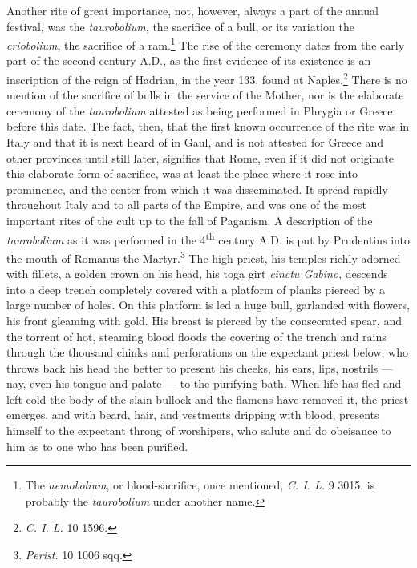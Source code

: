 \documentclass[a4paper, 11pt, oneside, polutonikogreek, english]{article}
\begin{document}
Another rite of great importance, not, however, always a part of the annual festival, was the \emph{taurobolium}, the sacrifice of a bull, or its variation the \emph{criobolium}, the sacrifice of a ram.\footnote{The \emph{aemobolium}, or blood-sacrifice, once mentioned, \emph{C. I. L.} 9 3015, is probably the \emph{taurobolium} under another name.} The rise of the ceremony dates from the early part of the second century \textsc{A.D.}, as the first evidence of its existence is an inscription of the reign of Hadrian, in the year 133, found at Naples.\footnote{\emph{C. I. L.} 10 1596.} There is no mention of the sacrifice of bulls in the service of the Mother, nor is the elaborate ceremony of the \emph{taurobolium} attested as being performed in Phrygia or Greece before this date. The fact, then, that the first known occurrence of the rite was in Italy and that it is next heard of in Gaul, and is not attested for Greece and other provinces until still later, signifies that Rome, even if it did not originate this elaborate form of sacrifice, was at least the place where it rose into prominence, and the center from which it was disseminated. It spread rapidly throughout Italy and to all parts of the Empire, and was one of the most important rites of the cult up to the fall of Paganism. A description of the \emph{taurobolium} as it was performed in the 4\textsuperscript{th} century \textsc{A.D.} is put by Prudentius into the mouth of Romanus the Martyr.\footnote{\emph{Perist.} 10 1006 sqq.} The high priest, his temples richly adorned with fillets, a golden crown on his head, his toga girt \emph{cinctu Gabino}, descends into a deep trench completely covered with a platform of planks pierced by a large number of holes. On this platform is led a huge bull, garlanded with flowers, his front gleaming with gold. His breast is pierced by the consecrated spear, and the torrent of hot, steaming blood floods the covering of the trench and rains through the thousand chinks and perforations on the expectant priest below, who throws back his head the better to present his cheeks, his ears, lips, nostrils --- nay, even his tongue and palate --- to the purifying bath. When life has fled and left cold the body of the slain bullock and the flamens have removed it, the priest emerges, and with beard, hair, and vestments dripping with blood, presents himself to the expectant throng of worshipers, who salute and do obeisance to him as to one who has been purified.
\end{document}
